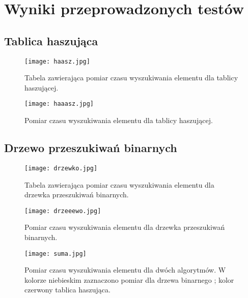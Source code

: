 \documentclass[11pt]{article}
\begin{document}
\newpage
\section{Wyniki przeprowadzonych testów}
\subsection{Tablica haszująca}


 
  \begin{figure}[ht!] 
\centering
 \texttt{[image: haasz.jpg]}
 \caption{Tabela zawierająca pomiar czasu wyszukiwania elementu dla tablicy haszującej. } 
\label{Wykresie nr 1}
 \end{figure}

 \begin{figure}[ht!] 
\centering
 \texttt{[image: haaasz.jpg]}
 \caption{Pomiar czasu wyszukiwania elementu dla tablicy haszującej. } 
\label{overflow}
 \end{figure}
 \newpage
\subsection{Drzewo przeszukiwań binarnych }

 
 \begin{figure}[ht!] 
\centering
 \texttt{[image: drzewko.jpg]}
 \caption{Tabela zawierająca pomiar czasu wyszukiwania elementu dla drzewka przeszukiwań binarnych. } 
\label{overflow}
 \end{figure}

  \begin{figure}[ht!] 
\centering
 \texttt{[image: drzeeewo.jpg]}
 \caption{Pomiar czasu wyszukiwania elementu dla drzewka przeszukiwań binarnych. } 
\label{Wykres nr 4}
 \end{figure}
 
   \begin{figure}[ht!] 
\centering
 \texttt{[image: suma.jpg]}
 \caption{Pomiar czasu wyszukiwania elementu dla dwóch algorytmów. W kolorze niebieskim zaznaczono pomiar dla drzewa binarnego ; kolor czerwony tablica haszująca. } 
\label{overflow}
 \end{figure}
 
\newpage
\end{document}
